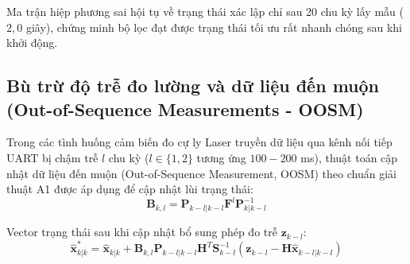 Ma trận hiệp phương sai hội tụ về trạng thái xác lập chỉ sau 20 chu kỳ lấy mẫu ($2{,}0$ giây), chứng minh bộ lọc đạt được trạng thái tối ưu rất nhanh chóng sau khi khởi động.

\subsection{Bù trừ độ trễ đo lường và dữ liệu đến muộn (Out-of-Sequence Measurements - OOSM)}

\hspace{0.5cm} Trong các tình huống cảm biến đo cự ly Laser truyền dữ liệu qua kênh nối tiếp UART bị chậm trễ $l$ chu kỳ ($l \in \{1, 2\}$ tương ứng $100 - 200$ ms), thuật toán cập nhật dữ liệu đến muộn (Out-of-Sequence Measurement, OOSM) theo chuẩn giải thuật A1 được áp dụng để cập nhật lùi trạng thái:
\begin{equation}
\mathbf{B}_{k, l} = \mathbf{P}_{k-l|k-l} \mathbf{F}^l \mathbf{P}_{k|k-l}^{-1}
\label{eq:oosm-retrodiction-matrix}
\end{equation}

Vector trạng thái sau khi cập nhật bổ sung phép đo trễ $\mathbf{z}_{k-l}$:
\begin{equation}
\hat{\mathbf{x}}_{k|k}^* = \hat{\mathbf{x}}_{k|k} + \mathbf{B}_{k, l} \mathbf{P}_{k-l|k-l} \mathbf{H}^T \mathbf{S}_{k-l}^{-1} \left( \mathbf{z}_{k-l} - \mathbf{H}\hat{\mathbf{x}}_{k-l|k-l} \right)
\label{eq:oosm-state-update-formula}
\end{equation}

\begin{table}[H]
\centering
\caption{Hiệu quả của giải thuật OOSM trong việc triệt tiêu sai số do độ trễ truyền thông cảm biến}
\label{tab:oosm-latency-compensation-metrics}
\end{table}

